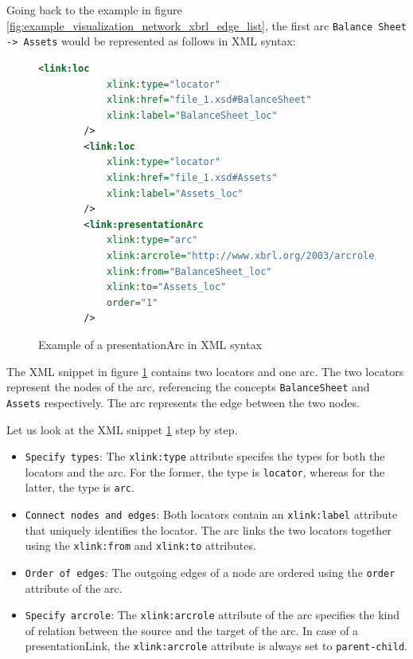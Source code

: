 Going back to the example in figure \ref{fig:example_visualization_network_xbrl_edge_list}, 
the first arc \texttt{Balance Sheet -> Assets} would be represented as follows in XML syntax:

\begin{figure}[H]
    \centering
    \begin{lstlisting}[language=XML]
        <link:loc 
            xlink:type="locator" 
            xlink:href="file_1.xsd#BalanceSheet"
            xlink:label="BalanceSheet_loc"
        />
        <link:loc 
            xlink:type="locator" 
            xlink:href="file_1.xsd#Assets"
            xlink:label="Assets_loc"
        />
        <link:presentationArc 
            xlink:type="arc" 
            xlink:arcrole="http://www.xbrl.org/2003/arcrole/parent-child" 
            xlink:from="BalanceSheet_loc" 
            xlink:to="Assets_loc"
            order="1"
        />
    \end{lstlisting}
    \caption{Example of a presentationArc in XML syntax}
    \label{fig:example_presentation_arc_xml}
\end{figure}

The XML snippet in figure \ref{fig:example_presentation_arc_xml} contains two locators and one arc.
The two locators represent the nodes of the arc, referencing the concepts \texttt{BalanceSheet} and \texttt{Assets} respectively.
The arc represents the edge between the two nodes.

Let us look at the XML snippet \ref{fig:example_presentation_arc_xml} step by step.

\begin{itemize}
    \item \texttt{Specify types}: The \texttt{xlink:type} attribute specifes the types for both the locators and the arc.
    For the former, the type is \texttt{locator}, whereas for the latter, the type is \texttt{arc}.
    \item \texttt{Connect nodes and edges}: Both locators contain an \texttt{xlink:label} attribute that uniquely identifies the locator.
    The arc links the two locators together using the \texttt{xlink:from} and \texttt{xlink:to} attributes.
    \item \texttt{Order of edges}: The outgoing edges of a node are ordered using the \texttt{order} attribute of the arc.
    \item \texttt{Specify arcrole}: The \texttt{xlink:arcrole} attribute of the arc specifies the kind of relation between the source and the target of the arc.
    In case of a presentationLink, the \texttt{xlink:arcrole} attribute is always set to \texttt{parent-child}.\label{sec:arcrole}
\end{itemize}

